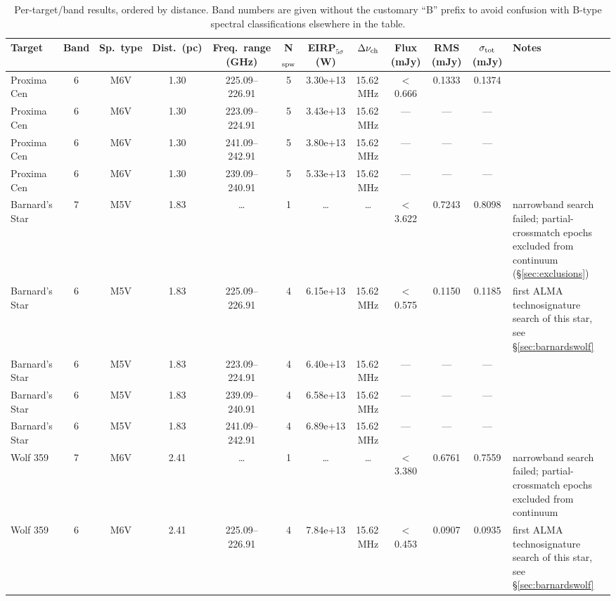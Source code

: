 \documentclass{openjournal}
\begin{document}
\begin{table}
\centering
\scriptsize
\setlength{\tabcolsep}{2pt}
\caption{Per-target/band results, ordered by distance. Band numbers are
given without the customary ``B'' prefix to avoid confusion with B-type
spectral classifications elsewhere in the table.}
\par\vspace{3pt}

\label{tab:full}
\begin{tabularx}{\textwidth}{@{}l c c c c c c c c c c X@{}}
\hline
Target & Band & Sp.\ type & Dist.\ (pc) & Freq.\ range (GHz) & N$_{\rm spw}$ & EIRP$_{5\sigma}$ (W) & $\Delta\nu_{\rm ch}$ & Flux (mJy) & RMS (mJy) & $\sigma_{\rm tot}$ (mJy) & Notes \\
\hline
 Proxima Cen & 6 & M6V & 1.30 & 225.09--226.91 & 5 & 3.30e+13 & 15.62\,MHz & $<$0.666 & 0.1333 & 0.1374 &  \\
 Proxima Cen & 6 & M6V & 1.30 & 223.09--224.91 & 5 & 3.43e+13 & 15.62\,MHz & --- & --- & --- &  \\
 Proxima Cen & 6 & M6V & 1.30 & 241.09--242.91 & 5 & 3.80e+13 & 15.62\,MHz & --- & --- & --- &  \\
 Proxima Cen & 6 & M6V & 1.30 & 239.09--240.91 & 5 & 5.33e+13 & 15.62\,MHz & --- & --- & --- &  \\
 Barnard's Star & 7 & M5V & 1.83 & \ldots & 1 & \ldots & \ldots & $<$3.622 & 0.7243 & 0.8098 & narrowband search failed; partial-crossmatch epochs excluded from continuum (\S\ref{sec:exclusions}) \\
 Barnard's Star & 6 & M5V & 1.83 & 225.09--226.91 & 4 & 6.15e+13 & 15.62\,MHz & $<$0.575 & 0.1150 & 0.1185 & first ALMA technosignature search of this star, see \S\ref{sec:barnardswolf} \\
 Barnard's Star & 6 & M5V & 1.83 & 223.09--224.91 & 4 & 6.40e+13 & 15.62\,MHz & --- & --- & --- &  \\
 Barnard's Star & 6 & M5V & 1.83 & 239.09--240.91 & 4 & 6.58e+13 & 15.62\,MHz & --- & --- & --- &  \\
 Barnard's Star & 6 & M5V & 1.83 & 241.09--242.91 & 4 & 6.89e+13 & 15.62\,MHz & --- & --- & --- &  \\
 Wolf  359 & 7 & M6V & 2.41 & \ldots & 1 & \ldots & \ldots & $<$3.380 & 0.6761 & 0.7559 & narrowband search failed; partial-crossmatch epochs excluded from continuum \\
 Wolf  359 & 6 & M6V & 2.41 & 225.09--226.91 & 4 & 7.84e+13 & 15.62\,MHz & $<$0.453 & 0.0907 & 0.0935 & first ALMA technosignature search of this star, see \S\ref{sec:barnardswolf} \\

\end{tabularx}
\end{table}
\end{document}
